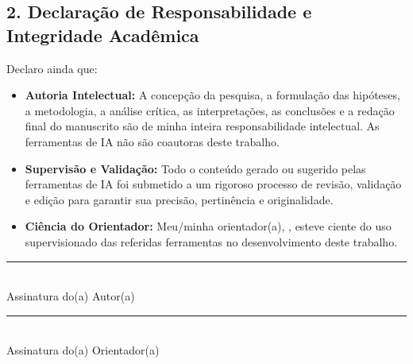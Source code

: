 \begin{spacing}{1.2}
\subsection*{2. Declaração de Responsabilidade e Integridade Acadêmica}
Declaro ainda que:
\begin{itemize}{\itemsep=0.2em}
    \item \textbf{Autoria Intelectual:} A concepção da pesquisa, a formulação das hipóteses, a metodologia, a análise crítica, as interpretações, as conclusões e a redação final do manuscrito são de minha inteira responsabilidade intelectual. As ferramentas de IA não são coautoras deste trabalho.
    \item \textbf{Supervisão e Validação:} Todo o conteúdo gerado ou sugerido pelas ferramentas de IA foi submetido a um rigoroso processo de revisão, validação e edição para garantir sua precisão, pertinência e originalidade.
    \item \textbf{Ciência do Orientador:} Meu/minha orientador(a), \@orientador, esteve ciente do uso supervisionado das referidas ferramentas no desenvolvimento deste trabalho.
\end{itemize}

\vfill %

\begin{center}
    \begin{minipage}{7cm}
        \centering
        \noindent\rule{7cm}{0.4pt} \\
        Assinatura do(a) Autor(a)
    \end{minipage}
    \hspace{1cm}
    \begin{minipage}{7cm}
        \centering
        \noindent\rule{7cm}{0.4pt} \\
        Assinatura do(a) Orientador(a)
    \end{minipage}
\end{center}

\end{spacing}

\cleardoublepage
